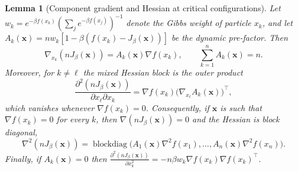 \documentclass{article} %
\theoremstyle{plain}
\newtheorem{lemma}[theorem]{Lemma}
\theoremstyle{definition}
\theoremstyle{remark}
\newcommand{\prefactor}[2]{A_{#1}(#2)}
\newcommand{\xx}{\mathbf{x}}
\begin{document}
\begin{lemma}[Component gradient and Hessian at critical configurations]
    \label{lem:derivative-of-J-proof}
    Let $w_k = e^{-\beta f(x_k)}(\sum_j e^{-\beta f(x_j)})^{-1}$ denote the Gibbs weight of particle $x_k$, and let $\prefactor{k}{\xx} = nw_k\left[1 - \beta(f(x_k) - J_\beta(\xx))\right]$ be the dynamic pre-factor. Then
    \begin{equation}
        \nabla_{x_k} (nJ_\beta(\xx)) = \prefactor{k}{\xx} \nabla f(x_k),
        \qquad
        \sum_{k=1}^n \prefactor{k}{\xx} = n.
        \label{eq:lemma-gradient}
    \end{equation}
    Moreover, for $k \neq \ell$ the mixed Hessian block is the outer product
    \begin{equation}
        \frac{\partial^2 (nJ_\beta(\xx))}{\partial x_\ell \partial x_k} = \nabla f(x_k)\bigl(\nabla_{x_\ell}\prefactor{k}{\xx}\bigr)^\top,
        \label{eq:mixed-block}
    \end{equation}
    which vanishes whenever $\nabla f(x_k)=0$. Consequently, if $\xx$ is such that $\nabla f(x_k)=0$ for every $k$, then $\nabla(nJ_\beta(\xx))=0$ and the Hessian is block diagonal,
    \begin{equation}
        \nabla^2(nJ_\beta(\xx)) = \operatorname{blockdiag}\bigl(\prefactor{1}{\xx}\nabla^2 f(x_1),\dots,\prefactor{n}{\xx}\nabla^2 f(x_n)\bigr).
        \label{eq:block-diagonal-hessian}
    \end{equation}
    Finally, if $\prefactor{k}{\xx}=0$ then $\frac{\partial^2(nJ_\beta(\xx))}{\partial x_k^2} = -n\beta w_k \nabla f(x_k)\nabla f(x_k)^\top$.
\end{lemma}
\end{document}

